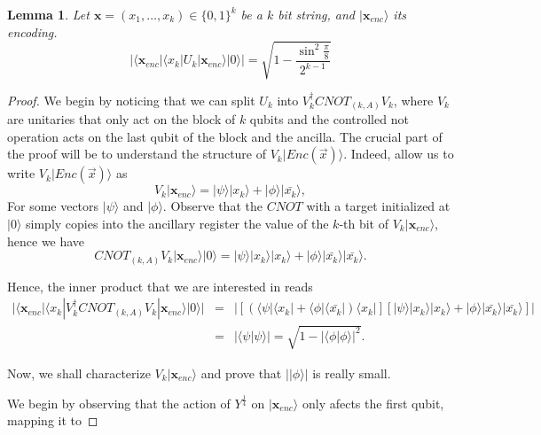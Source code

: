 \documentclass{article}
\newtheorem{lemma}[theorem]{Lemma}
\theoremstyle{definition}
\newcommand{\ket}[1]{|#1\rangle}
\newcommand{\bra}[1]{\langle#1|}
\newcommand{\braket}[2]{\langle{#1}|{#2}\rangle}
\begin{document}
\begin{lemma}
Let $\textbf{x}=(x_1,\dots,x_k)\in\{0,1\}^k$ be a $k$ bit string, and $\ket{\textbf{x}_{enc}}$ its encoding.
\begin{equation}
|\bra{\textbf{x}_{enc}}\bra{x_k}U_k\ket{\textbf{x}_{enc}}\ket{0}|= \sqrt{1-\frac{\sin^2\frac{\pi}{8}}{2^{k-1}}}
\end{equation}
\label{lem:bit_extract}
\end{lemma}
\begin{proof}
We begin by noticing that we can split $U_k$ into $V_k^\dagger CNOT_{(k,A)}V_k$, where $V_k$ are unitaries that only act on the block of $k$ qubits and the controlled not operation acts on the last qubit of the block and the ancilla. The crucial part of the proof will be to understand the structure of  $V_k\ket{Enc(\vec{x})}$. Indeed, allow us to write  $V_k\ket{Enc(\vec{x})}$ as
\[V_k\ket{\textbf{x}_{enc}}=\ket{\psi}\ket{x_k}+\ket{\phi}\ket{\bar{x_k}},\]
For some vectors $\ket{\psi}$ and $\ket{\phi}$. Observe that the $CNOT$ with a target initialized at $\ket{0}$ simply copies into the ancillary register the value of the $k$-th bit of $V_k\ket{\textbf{x}_{enc}}$, hence we have
\begin{equation}
CNOT_{(k,A)}V_k\ket{\textbf{x}_{enc}}\ket{0}=\ket{\psi}\ket{x_k}\ket{x_k}+\ket{\phi}\ket{\bar{x_k}}\ket{\bar{x_k}}.
\end{equation}

Hence, the inner product that we are interested in reads
\begin{eqnarray}
|\bra{\textbf{x}_{enc}}\bra{x_k}V_k^\dagger CNOT_{(k,A)}V_k\ket{\textbf{x}_{enc}}\ket{0}|&=&|\left[\left(\bra{\psi}\bra{x_k}+\bra{\phi}\bra{\bar{x_k}}\right)\bra{x_k}\right]\left[\ket{\psi}\ket{x_k}\ket{x_k}+\ket{\phi}\ket{\bar{x_k}}\ket{\bar{x_k}}\right]|\\
&=&|\braket{\psi}{\psi}|=\sqrt{1-|\braket{\phi}{\phi}|^2}.
\end{eqnarray}

Now, we shall characterize $V_k\ket{\textbf{x}_{enc}}$ and prove that $|\ket{\phi}|$ is really small.

We begin by observing that the action of $Y^{\frac{1}{4}}$ on $\ket{\textbf{x}_{enc}}$ only afects the first qubit, mapping it to


\end{proof}
\end{document}
